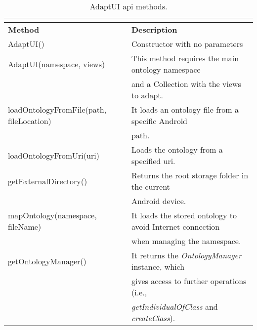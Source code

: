 \begin{center}
\footnotesize
\begin{longtable}{l l}
  \caption{AdaptUI \ac{api} methods.}\\
  \label{tbl:api} \\
  \hline 
  \textbf{Method}				& \textbf{Description}\\
  \hline
  AdaptUI()					& Constructor with no parameters			\\
  AdaptUI(namespace, views)			& This method requires the main ontology namespace	\\
						& and a Collection with the views to adapt.		\\
  loadOntologyFromFile(path, fileLocation)	& It loads an ontology file from a specific Android	\\
						& path.							\\
  loadOntologyFromUri(uri)			& Loads the ontology from a specified \ac{uri}.		\\
  getExternalDirectory()			& Returns the root storage folder in the current	\\
						& Android device.					\\
  mapOntology(namespace, fileName)		& It loads the stored ontology to avoid Internet connection\\
						& when managing the namespace.				\\
  getOntologyManager()				& It returns the \textit{OntologyManager} instance, which\\
						& gives access to further operations (i.e., 		\\
						& \textit{getIndividualOfClass} and \textit{createClass}).\\
  \hline
\end{longtable}
\end{center}


